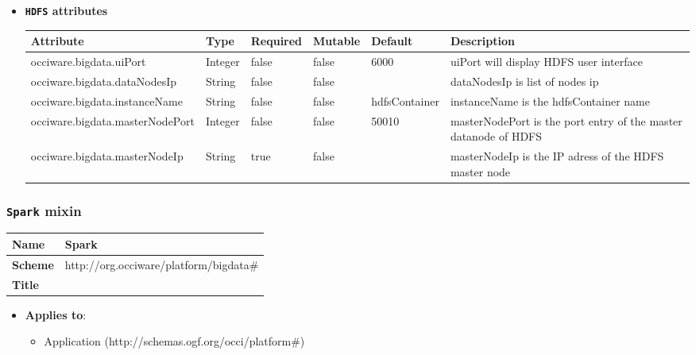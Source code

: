 \begin{itemize}
\item \textbf{\texttt{HDFS} attributes}

\begin{tabularx}{\textwidth}{|l|l|p{1.4cm}|p{1.3cm}|l|X|}
  \hline
  \textbf{Attribute} & \textbf{Type} & \textbf{Required} & \textbf{Mutable} & \textbf{Default} & \textbf{Description} \\
  \hline  
  occiware.bigdata.uiPort & Integer & false & false & 6000 & uiPort will display HDFS user interface \\
  \hline
  occiware.bigdata.dataNodesIp & String & false & false &  & dataNodesIp is list of nodes ip \\
  \hline
  occiware.bigdata.instanceName & String & false & false & hdfsContainer & instanceName is the hdfsContainer name \\
  \hline
  occiware.bigdata.masterNodePort & Integer & false & false & 50010 & masterNodePort is the port entry of the master datanode of HDFS  \\
  \hline
  occiware.bigdata.masterNodeIp & String & true & false &  & masterNodeIp is the IP adress of the HDFS master node \\
  \hline
\end{tabularx}
\end{itemize}


 
\subsubsection{\texttt{Spark} mixin}
\begin{center}
\begin{tabular}{|l|l|}
  \hline
  \textbf{Name} & Spark \\
  \hline  
  \textbf{Scheme} & http://org.occiware/platform/bigdata\# \\
  \hline
  \textbf{Title} &  \\
  \hline
\end{tabular}
\end{center}
\begin{itemize}
\item \textbf{Applies to}:
\begin{itemize}
	\item Application (http://schemas.ogf.org/occi/platform\#)
\end{itemize}
\end{itemize} 

